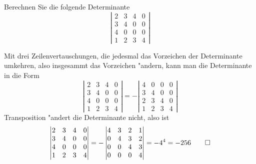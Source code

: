 Berechnen Sie die folgende Determinante
\[
\left|
\begin{matrix}
2&3&4&0\\
3&4&0&0\\
4&0&0&0\\
1&2&3&4
\end{matrix}
\right|
\]

\begin{loesung}
Mit drei Zeilenvertauschungen, die jedesmal das Vorzeichen der
Determinante umkehren, also insgesammt das Vorzeichen "andern,
kann man die Determinante in die Form
\[
\left|
\begin{matrix}
2&3&4&0\\
3&4&0&0\\
4&0&0&0\\
1&2&3&4
\end{matrix}
\right|
=
-\left|
\begin{matrix}
4&0&0&0\\
3&4&0&0\\
2&3&4&0\\
1&2&3&4
\end{matrix}
\right|
\]
Transposition "andert die Determinante nicht, also ist
\[
\left|
\begin{matrix}
2&3&4&0\\
3&4&0&0\\
4&0&0&0\\
1&2&3&4
\end{matrix}
\right|
=
-\left|
\begin{matrix}
4&3&2&1\\
0&4&3&2\\
0&0&4&3\\
0&0&0&4
\end{matrix}
\right|=-4^4=-256
\qedhere
\]
\end{loesung}

